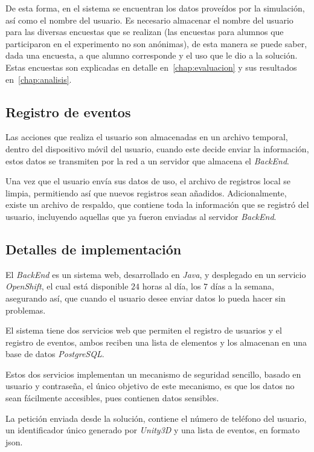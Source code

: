 De esta forma, en el sistema se encuentran los datos proveídos por la
simulación, así como el nombre del usuario. Es necesario almacenar el nombre del
usuario para las diversas encuestas que se realizan (las encuestas para alumnos
que participaron en el experimento no son anónimas), de esta manera se puede
saber, dada una encuesta, a que alumno corresponde y el uso que le dio a la
solución. Estas encuestas son explicadas en detalle en~\ref{chap:evaluacion} y sus 
resultados en~\ref{chap:analisis}.

\subsection{Registro de eventos}

Las acciones que realiza el usuario son almacenadas en un archivo temporal,
dentro del dispositivo móvil del usuario, cuando este decide enviar la
información, estos datos se transmiten por la red a un servidor que almacena el
\textit{BackEnd}.

Una vez que el usuario envía sus datos de uso, el archivo de registros
local se limpia, permitiendo así que nuevos registros sean añadidos.
Adicionalmente, existe un archivo de respaldo, que contiene toda la información
que se registró del usuario, incluyendo aquellas que ya fueron enviadas al
servidor \textit{BackEnd}.

\subsection{Detalles de implementación}

El \textit{BackEnd} es un sistema web, desarrollado en \textit{Java}, y
desplegado en un servicio \textit{OpenShift}, el cual está disponible $24$ horas
al día, los $7$ días a la semana, asegurando así, que cuando el usuario desee
enviar datos lo pueda hacer sin problemas.

El sistema tiene dos servicios web que permiten el registro de usuarios y el
registro de eventos, ambos reciben una lista de elementos y los almacenan en una
base de datos \textit{PostgreSQL}.

Estos dos servicios implementan un mecanismo de seguridad sencillo, basado en usuario y
contraseña, el único objetivo de este mecanismo, es que los datos no sean
fácilmente accesibles, pues contienen datos sensibles.

La petición enviada desde la solución, contiene el número de teléfono del
usuario, un identificador único generado por \textit{Unity3D} y una lista de
eventos, en formato \Gls{json}.

